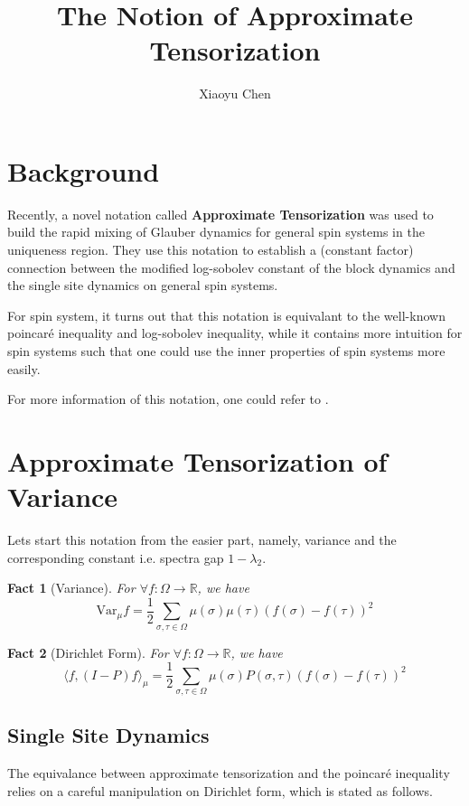 \documentclass{article}
\title{The Notion of Approximate Tensorization}
\author{Xiaoyu Chen}
\date{}
\newtheorem{fact}{Fact}[section]
\def\<{\langle}
\def\>{\rangle}
\def\Var{\mathrm{Var}}
\begin{document}
\maketitle
\section{Background}
Recently, a novel notation called \textbf{Approximate Tensorization} was used to build the rapid mixing of Glauber dynamics for general spin systems in the uniqueness region\cite{CLV20-1}.
They use this notation to establish a (constant factor) connection between the modified log-sobolev constant of the block dynamics and the single site dynamics on general spin systems.

For spin system, it turns out that this notation is equivalant to the well-known poincar{\'e} inequality and log-sobolev inequality, while it contains more intuition for spin systems such that one could use the inner properties of spin systems more easily.

For more information of this notation, one could refer to \cite{caputo2015approximate, caputo2020block}.

\section{Approximate Tensorization of Variance}
Lets start this notation from the easier part, namely, variance and the corresponding constant i.e. spectra gap $1 - \lambda_2$.

\begin{fact}[Variance]
  For $\forall f: \Omega \to \mathbb{R}$, we have
  \[\Var_\mu f = \frac{1}{2}\sum_{\sigma,\tau\in\Omega} \mu(\sigma)\mu(\tau)\left(f(\sigma) - f(\tau)\right)^2\]
\end{fact}

\begin{fact}[Dirichlet Form]
  For $\forall f: \Omega \to \mathbb{R}$, we have
  \[\<f, (I - P) f\>_\mu = \frac{1}{2} \sum_{\sigma, \tau\in\Omega}\mu(\sigma)P(\sigma, \tau)\left(f(\sigma) - f(\tau)\right)^2\]
\end{fact}

\subsection{Single Site Dynamics}
The equivalance between approximate tensorization and the poincar{\'e} inequality relies on a careful manipulation on Dirichlet form, which is stated as follows.
\end{document}
